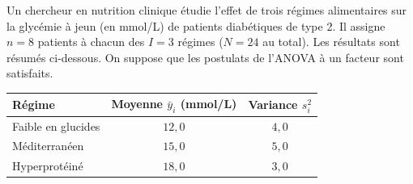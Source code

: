 \documentclass{Evaluation}
\begin{document}
\begin{questions}
\begin{parts}
\end{parts}

\pageblanche


\question
Un chercheur en nutrition clinique étudie l'effet de trois régimes alimentaires sur la
glycémie à jeun (en mmol/L) de patients diabétiques de type 2.
Il assigne $n=8$ patients à chacun des $I=3$ régimes ($N=24$ au total).
Les résultats sont résumés ci-dessous.
On suppose que les postulats de l'ANOVA à un facteur sont satisfaits.

\medskip
\begin{center}
\renewcommand{\arraystretch}{1.4}
\begin{tabular}{|l|c|c|}
\hline
\textbf{Régime} & \textbf{Moyenne} $\bar{y}_i$ (mmol/L) & \textbf{Variance} $s_i^2$ \\
\hline
Faible en glucides & $12{,}0$ & $4{,}0$ \\
Méditerranéen      & $15{,}0$ & $5{,}0$ \\
Hyperprotéiné      & $18{,}0$ & $3{,}0$ \\
\hline
\end{tabular}
\end{center}
\medskip

\end{questions}
\end{document}
